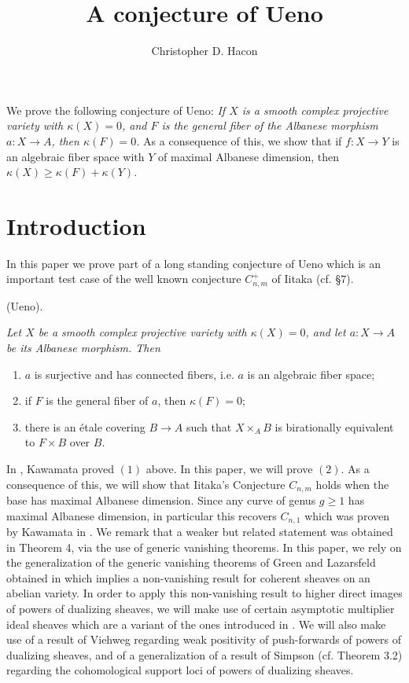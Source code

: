 \documentclass[10pt, a4paper]{amsart}
\title{A conjecture of Ueno}
\author {Christopher D. Hacon}
\date{}
\newcommand\alb{{ a}}
\newcommand\lra{\longrightarrow}
\newcommand\Alb{{ A}}
\begin{document}
\abstract We prove the following conjecture of Ueno: {\it  
If $X$ is a smooth complex projective variety with
$\kappa (X)= 0$, and $F$ is the general fiber of the Albanese morphism
$\alb :X\lra \Alb $, then $\kappa (F)=0$.} As a consequence of this, we show 
that if $f:X\lra Y$ is an algebraic fiber space with $Y$ of maximal
Albanese dimension, then $\kappa (X)\geq \kappa (F)+\kappa (Y)$.
\endabstract

\maketitle
\section{Introduction}
In this paper we prove part of a long standing conjecture of Ueno
which is an important test case of the well known conjecture $C_{n,m}^+$ of 
Iitaka (cf. \cite{Mo} \S 7).

\bigskip
{} (Ueno).
{\em Let $X$ be a smooth complex projective variety with $\kappa
(X)=0$, and let $\alb :X\lra \Alb $ be its Albanese morphism. Then
\begin{enumerate}
\item $\alb$ is surjective and has connected fibers, i.e. $\alb$ is an 
algebraic fiber space;
\item if $F$ is the general fiber of $\alb$, then $\kappa (F)=0$;
\item there is an \'etale covering $B\lra \Alb$ such that 
$X\times _\Alb B$ is birationally equivalent to $F\times B$ over $B$.
\end{enumerate} }

In \cite{Ka1}, Kawamata proved $(1)$ above.
In this paper, we will prove $(2)$. 
As a consequence of this, we will show that Iitaka's Conjecture
$C_{n,m}$ holds when the base has maximal Albanese dimension.
Since any curve of genus $g\geq 1$ has maximal Albanese dimension,
in particular this recovers $C_{n,1}$ which was proven by Kawamata
in \cite{Ka2}.
We remark that a weaker but related statement was obtained in \cite{CH1}
Theorem 4, 
via the use of generic vanishing theorems.
In this paper, we rely on the generalization of the generic vanishing
theorems of Green and Lazarsfeld obtained in \cite{Hac} which implies a 
non-vanishing result for coherent sheaves on an abelian variety.
In order to apply this non-vanishing result to higher direct images
of powers of dualizing sheaves, we will make use of
certain asymptotic multiplier ideal sheaves
which are a variant of the ones introduced in \cite{Hac}.
We will also make use of a result of Viehweg regarding weak positivity of 
push-forwards of powers of dualizing sheaves, and of a generalization of
a result of Simpson (cf. \cite{CH2} Theorem 3.2) 
regarding the cohomological support
loci of powers of dualizing sheaves. 
\bigskip
\end{document}
